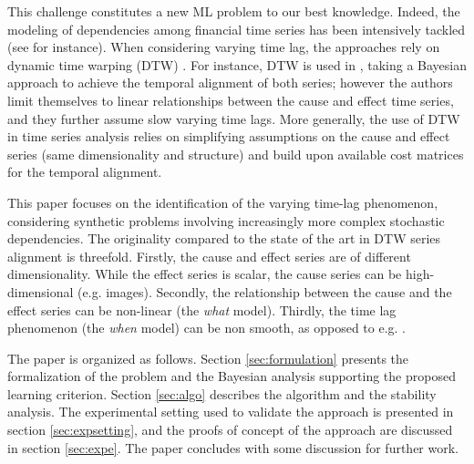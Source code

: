 This challenge constitutes a new ML problem to our best knowledge. Indeed, the modeling of dependencies among financial time series has been intensively tackled (see \cite{ZHOU2006195} for instance). When considering varying time lag, the approaches rely on dynamic time warping (DTW) \cite{SakoeShiba1978}. For instance, DTW is used in \cite{SignalDiffusion}, taking a Bayesian approach to achieve the temporal alignment of both series; however the authors limit themselves to linear relationships between the cause and effect time series, and they further assume slow varying time lags. More generally, the use of DTW in time series analysis relies on simplifying assumptions on the cause and effect series (same dimensionality and structure) and build upon available cost matrices for the temporal alignment. 

This paper focuses on the identification of the varying time-lag phenomenon, considering synthetic problems involving increasingly more complex stochastic 
dependencies. The originality compared to the state of the art in DTW series alignment is threefold. Firstly, the cause and effect series are of different dimensionality. While the effect series is scalar, the cause series can be high-dimensional (e.g. images). Secondly, the relationship between the cause and the effect series can be non-linear (the {\em what} model). Thirdly, the time lag phenomenon (the {\em when} model) can be non smooth, as opposed to e.g. \cite{ZHOU2006195}.

The paper is organized as follows. Section \ref{sec:formulation} presents the formalization of the problem and the Bayesian analysis supporting the proposed learning criterion. Section \ref{sec:algo} describes the algorithm and the stability analysis. The experimental setting used to validate the approach is presented in section \ref{sec:expsetting}, and the proofs of concept of the approach are discussed in section \ref{sec:expe}. The paper concludes with some discussion for further work.
